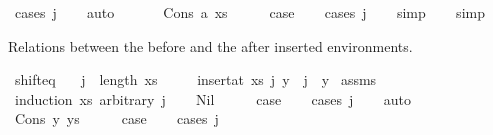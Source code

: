 \begin{isabellebody}
\ {\isacharparenleft}{\kern0pt}cases\ j{\isacharparenright}{\kern0pt}\isanewline
\ \ \isamarkupfalse%
\ auto\isanewline
\ \ \isamarkupfalse%
\isanewline
{}\isamarkupfalse%
\isanewline
\ \ \isamarkupfalse%
\ {\isacharparenleft}{\kern0pt}Cons\ a\ xs{\isacharparenright}{\kern0pt}\isanewline
\ \ \isamarkupfalse%
\ \isamarkupfalse%
\ {\isacharquery}{\kern0pt}case\isanewline
\ \ \isamarkupfalse%
\ {\isacharparenleft}{\kern0pt}cases\ j{\isacharparenright}{\kern0pt}\isanewline
\ \ \isamarkupfalse%
\ simp\isanewline
\ \ \isamarkupfalse%
\ simp\isanewline
{}\isamarkupfalse%
%
\endisatagproof
{\isafoldproof}%
%
\isadelimproof
%
\endisadelimproof
%
\begin{isamarkuptext}%
Relations between the before and the after inserted environments.%
\end{isamarkuptext}\isamarkuptrue%
\isamarkupfalse%
\ shift{\isacharunderscore}{\kern0pt}eq{\isacharcolon}{\kern0pt}\isanewline
\ \ \ {\isachardoublequoteopen}j\ {\isasymle}\ length\ xs{\isachardoublequoteclose}\isanewline
\ \ \ \ \ {\isachardoublequoteopen}{\isacharparenleft}{\kern0pt}insert{\isacharunderscore}{\kern0pt}at\ xs\ j\ y{\isacharparenright}{\kern0pt}\ {\isacharbang}{\kern0pt}\ j\ {\isacharequal}{\kern0pt}\ y{\isachardoublequoteclose}\isanewline
%
\isadelimproof
%
\endisadelimproof
%
\isatagproof
{}\isamarkupfalse%
\ assms\isanewline
{}\isamarkupfalse%
\ {\isacharparenleft}{\kern0pt}induction\ xs\ arbitrary{\isacharcolon}{\kern0pt}\ j{\isacharparenright}{\kern0pt}\isanewline
\ \ \isamarkupfalse%
\ Nil\isanewline
\ \ \isamarkupfalse%
\ \isamarkupfalse%
\ {\isacharquery}{\kern0pt}case\isanewline
\ \ \isamarkupfalse%
\ {\isacharparenleft}{\kern0pt}cases\ j{\isacharparenright}{\kern0pt}\isanewline
\ \ \isamarkupfalse%
\ auto\isanewline
\ \ \isamarkupfalse%
\isanewline
{}\isamarkupfalse%
\isanewline
\ \ \isamarkupfalse%
\ {\isacharparenleft}{\kern0pt}Cons\ y\ ys{\isacharparenright}{\kern0pt}\isanewline
\ \ \isamarkupfalse%
\ \isamarkupfalse%
\ {\isacharquery}{\kern0pt}case\isanewline
\ \ \isamarkupfalse%
\ {\isacharparenleft}{\kern0pt}cases\ j{\isacharparenright}{\kern0pt}\isanewline

\end{isabellebody}
